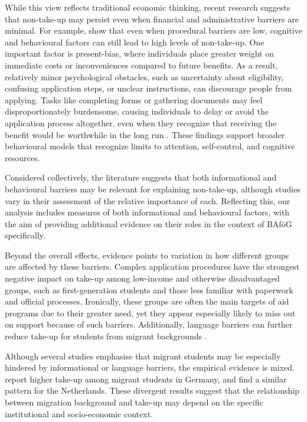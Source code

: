 While this view reflects traditional economic thinking, recent research suggests that non-take-up may persist even when financial and administrative barriers are minimal. For example, \cite{bhargava_psychological_2015} show that even when procedural barriers are low, cognitive and behavioural factors can still lead to high levels of non-take-up. One important factor is present-bias, where individuals place greater weight on immediate costs or inconveniences compared to future benefits. As a result, relatively minor psychological obstacles, such as uncertainty about eligibility, confusing application steps, or unclear instructions, can discourage people from applying. Tasks like completing forms or gathering documents may feel disproportionately burdensome, causing individuals to delay or avoid the application process altogether, even when they recognize that receiving the benefit would be worthwhile in the long run \citep{currie_takeup_2004}. These findings support broader behavioural models that recognize limits to attention, self-control, and cognitive resources. 

Considered collectively, the literature suggests that both informational and behavioural barriers may be relevant for explaining non-take-up, although studies vary in their assessment of the relative importance of each. Reflecting this, our analysis includes measures of both informational and behavioural factors, with the aim of providing additional evidence on their roles in the context of BAföG specifically.

Beyond the overall effects, evidence points to variation in how different groups are affected by these barriers. Complex application procedures have the strongest negative impact on take-up among low-income and otherwise disadvantaged groups, such as first-generation students and those less familiar with paperwork and official processes. Ironically, these groups are often the main targets of aid programs due to their greater need, yet they appear especially likely to miss out on support because of such barriers. Additionally, language barriers can further reduce take-up for students from migrant backgrounds \citep{dynarski_cost_2006, bhargava_psychological_2015, currie_takeup_2004}.

Although several studies emphasise that migrant students may be especially hindered by informational or language barriers, the empirical evidence is mixed. \cite{herber_non-take-up_2019} report higher take-up among migrant students in Germany, and \cite{konijn_quantifying_2023} find a similar pattern for the Netherlands. These divergent results suggest that the relationship between migration background and take-up may depend on the specific institutional and socio-economic context.

